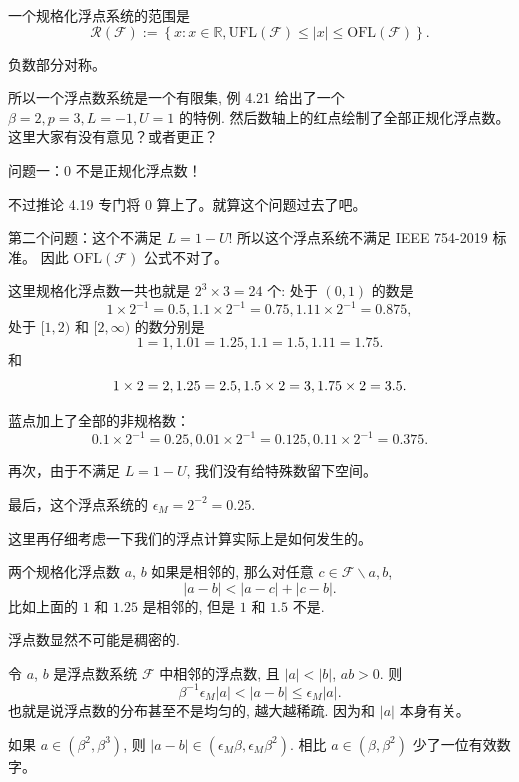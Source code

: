 \documentclass[a4paper]{ctexart}
\begin{document}
{ 一个规格化浮点系统的范围是
$$
\mathscr{R}(\mathscr{F}) := \left\{x : x \in \mathbb{R},
\mbox{UFL}(\mathscr{F}) \leq |x| \leq \mbox{OFL}(\mathscr{F})\right\}.
$$

负数部分对称。

所以一个浮点数系统是一个有限集, 例 4.21 给出了一个 $\beta = 2, p = 3, L = -1, U = 1$ 的特例. 
然后数轴上的红点绘制了全部正规化浮点数。这里大家有没有意见？或者更正？

问题一：$0$ 不是正规化浮点数！

不过推论 4.19 专门将 $0$ 算上了。就算这个问题过去了吧。

第二个问题：这个不满足 $L = 1 - U$! 所以这个浮点系统不满足 IEEE 754-2019 标准。
因此 $\mbox{OFL}(\mathscr{F})$ 公式不对了。

这里规格化浮点数一共也就是 $2^3 \times 3 = 24$ 个:
处于 $(0, 1)$ 的数是 
$$
1 \times 2^{-1} = 0.5, 1.1 \times 2^{-1} = 0.75, 1.11 \times 2 ^{-1} = 0.875,
$$
处于 $[1, 2)$ 和 $[2, \infty)$ 的数分别是 
$$
1 = 1, 1.01 = 1.25, 1.1 = 1.5, 1.11 = 1.75.
$$
和
$$
1 \times 2 = 2, 1.25 \time 2 = 2.5, 1.5 \times 2 = 3, 1.75 \times 2 = 3.5.
$$

蓝点加上了全部的非规格数：
$$
0.1 \times 2^{-1} = 0.25, 0.01 \times 2^{-1} = 0.125, 0.11 \times 2^{-1} = 0.375.
$$

再次，由于不满足 $L = 1 - U$, 我们没有给特殊数留下空间。 

最后，这个浮点系统的 $\epsilon_M = 2^{-2} = 0.25.$

这里再仔细考虑一下我们的浮点计算实际上是如何发生的。

 两个规格化浮点数 $a$, $b$ 如果是相邻的,
那么对任意 $c \in \mathscr{F} \backslash {a, b}$,
$$
|a - b| < |a - c| + |c - b|.
$$
比如上面的 $1$ 和 $1.25$ 是相邻的, 但是 $1$ 和 $1.5$ 不是.

浮点数显然不可能是稠密的.

 令 $a$, $b$ 是浮点数系统 $\mathscr{F}$
中相邻的浮点数, 且 $|a| < |b|$, $ab > 0$. 则
$$
\beta^{-1} \epsilon_M |a| < |a - b| \leq \epsilon_M |a|.
$$
也就是说浮点数的分布甚至不是均匀的, 越大越稀疏. 因为和 $|a|$ 本身有关。

如果 $ a \in (\beta^2, \beta^3)$, 
则 $|a - b| \in (\epsilon_M \beta, \epsilon_M \beta^2)$.
相比 $ a \in (\beta, \beta^2)$ 少了一位有效数字。

}
\end{document}
